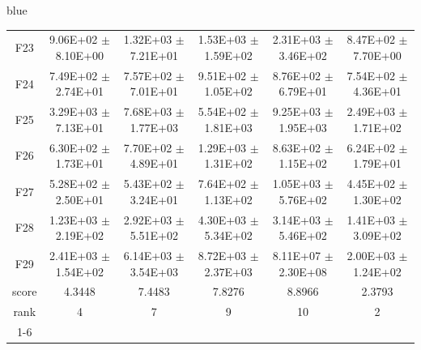 \documentclass[journal, onecolumn]{IEEEtran}
\begin{document}
\begin{color}{blue}
\begin{table}[htbp!]
\begin{tabular}{c|ccccc}
		F23	 &	9.06E+02	$\pm$	8.10E+00		 &	1.32E+03	$\pm$	7.21E+01		 &	1.53E+03	$\pm$	1.59E+02		 &	2.31E+03	$\pm$	3.46E+02		 &	8.47E+02	$\pm$	7.70E+00	\\
		F24	 &	7.49E+02	$\pm$	2.74E+01		 &	7.57E+02	$\pm$	7.01E+01		 &	9.51E+02	$\pm$	1.05E+02		 &	8.76E+02	$\pm$	6.79E+01		 &	7.54E+02	$\pm$	4.36E+01	\\
		F25	 &	3.29E+03	$\pm$	7.13E+01		 &	7.68E+03	$\pm$	1.77E+03		 &	5.54E+02	$\pm$	1.81E+03		 &	9.25E+03	$\pm$	1.95E+03		 &	2.49E+03	$\pm$	1.71E+02	\\
		F26	 &	6.30E+02	$\pm$	1.73E+01		 &	7.70E+02	$\pm$	4.89E+01		 &	1.29E+03	$\pm$	1.31E+02		 &	8.63E+02	$\pm$	1.15E+02		 &	6.24E+02	$\pm$	1.79E+01	\\
		F27	 &	5.28E+02	$\pm$	2.50E+01		 &	5.43E+02	$\pm$	3.24E+01		 &	7.64E+02	$\pm$	1.13E+02		 &	1.05E+03	$\pm$	5.76E+02		 &	4.45E+02	$\pm$	1.30E+02	\\
		F28	 &	1.23E+03	$\pm$	2.19E+02		 &	2.92E+03	$\pm$	5.51E+02		 &	4.30E+03	$\pm$	5.34E+02		 &	3.14E+03	$\pm$	5.46E+02		 &	1.41E+03	$\pm$	3.09E+02	\\
		F29	 &	2.41E+03	$\pm$	1.54E+02		 &	6.14E+03	$\pm$	3.54E+03		 &	8.72E+03	$\pm$	2.37E+03		 &	8.11E+07	$\pm$	2.30E+08		 &	2.00E+03	$\pm$	1.24E+02	\\\hline
		score	 	& 4.3448 & 7.4483 & 7.8276 & 8.8966 & 2.3793											\\												
		rank 		& 4 & 7 & 9 & 10 & 2											\\	\cline{1-6}											
		
	\end{tabular}
\end{table}


\end{color}
\end{document}
